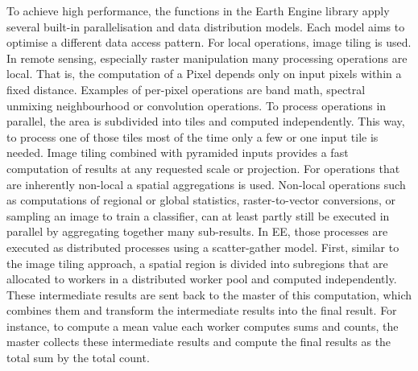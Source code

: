To achieve high performance, the functions in the Earth Engine library apply several built-in parallelisation and data distribution models. Each model aims to optimise a different data access pattern.
For local operations, image tiling is used.
In remote sensing, especially raster manipulation many processing operations are local. That is, the computation of a Pixel depends only on input pixels within a fixed distance. Examples of per-pixel operations are band math, spectral unmixing neighbourhood or convolution operations. To process operations in parallel, the area is subdivided into tiles and computed independently. This way, to process one of those tiles most of the time only a few or one input tile is needed. Image tiling combined with pyramided inputs provides a fast computation of results at any requested scale or projection.
For operations that are inherently non-local a spatial aggregations is used.
Non-local operations such as computations of regional or global statistics, raster-to-vector conversions, or sampling an image to train a classifier, can at least partly still be executed in parallel by aggregating together many sub-results. In EE, those processes are executed as distributed processes using a scatter-gather model. First, similar to the image tiling approach, a spatial region is divided into subregions that are allocated to workers in a distributed worker pool and computed independently. These intermediate results are sent back to the master of this computation, which combines them and transform the intermediate results into the final result. For instance, to compute a mean value each worker computes sums and counts, the master collects these intermediate results and compute the final results as the total sum by the total count.



